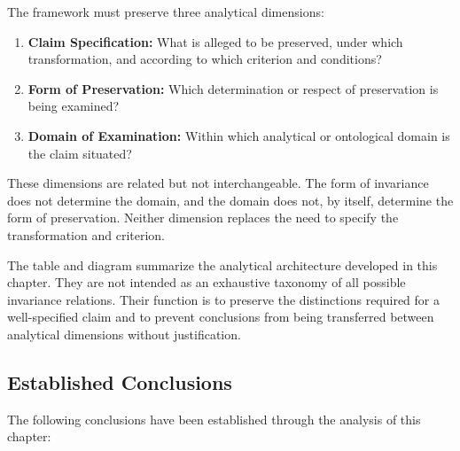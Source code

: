 The framework must preserve three analytical
dimensions:

\begin{enumerate}
    \item \textbf{Claim Specification:}
          What is alleged to be preserved, under which
          transformation, and according to which
          criterion and conditions?

    \item \textbf{Form of Preservation:}
          Which determination or respect of preservation
          is being examined?

    \item \textbf{Domain of Examination:}
          Within which analytical or ontological domain
          is the claim situated?
\end{enumerate}

These dimensions are related but not interchangeable.
The form of invariance does not determine the domain,
and the domain does not, by itself, determine the
form of preservation. Neither dimension replaces
the need to specify the transformation and criterion.





The table and diagram summarize the analytical
architecture developed in this chapter. They are
not intended as an exhaustive taxonomy of all
possible invariance relations. Their function is
to preserve the distinctions required for a
well-specified claim and to prevent conclusions
from being transferred between analytical dimensions
without justification.

\subsection{Established Conclusions}

The following conclusions have been established
through the analysis of this chapter:

